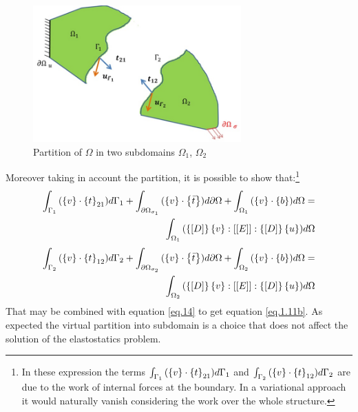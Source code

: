  \begin{figure}[ht]
 \centering
 \includegraphics[width=8cm]{images/Ch1/free_body}
 \caption{Partition of $\Omega$ in two subdomains $\Omega_1$, $\Omega_2$} 
 \label{fig.1.5}
 \end{figure}
 
 Moreover taking in account the partition, it is possible to show that:\footnote{In these expression the terms $\int_{\Gamma_1}{(\left\lbrace{v}\right \rbrace \cdot \left\lbrace{t}\right \rbrace_{21} )d\Gamma_1}$ and $\int_{\Gamma_2}{(\left\lbrace{v}\right \rbrace \cdot \left\lbrace{t}\right \rbrace_{12} )d\Gamma_2}$ are due to the work of internal forces at the boundary. In a variational approach it would naturally vanish considering the work over the whole structure.}
 \begin{equation}
 \begin{aligned}
 \label{eq.15}
 \int_{\Gamma_1}{(\left\lbrace{v}\right \rbrace \cdot \left\lbrace{t}\right \rbrace_{21} )d\Gamma_1}+\int_{\partial \Omega_{\sigma_1}}{(\left\lbrace{v}\right \rbrace \cdot \left\lbrace{\bar{t}}\right \rbrace )d\partial \Omega}+\int_{\Omega_1}{(\left\lbrace{v}\right \rbrace \cdot \left\lbrace{b}\right \rbrace) d\Omega} =\\\int_{\Omega_1}{(\left\lbrace{\ensuremath\left[{D}\right]}\right \rbrace \left\lbrace{v}\right \rbrace :\left[{\left[{E}\right]}\right]:\left\lbrace{\ensuremath\left[{D}\right]}\right \rbrace \left\lbrace{u}\right \rbrace  )d\Omega}
 \end{aligned}
 \end{equation}
 \begin{equation}
 \begin{split}
 \label{eq.16}
 \int_{\Gamma_2}{(\left\lbrace{v}\right \rbrace \cdot \left\lbrace{t}\right \rbrace_{12} )d\Gamma_2}+\int_{\partial \Omega_{\sigma_2}}{(\left\lbrace{v}\right \rbrace \cdot \left\lbrace{\bar{t}}\right \rbrace )d\partial \Omega}+\int_{ \Omega_2}{(\left\lbrace{v}\right \rbrace \cdot \left\lbrace{b}\right \rbrace) d\Omega}=\\\int_{ \Omega_2}{(\left\lbrace{\ensuremath\left[{D}\right]}\right \rbrace \left\lbrace{v}\right \rbrace :\left[{\left[{E}\right]}\right]:\left\lbrace{\ensuremath\left[{D}\right]}\right \rbrace \left\lbrace{u}\right \rbrace  )d\Omega}
 \end{split}
 \end{equation}
 That may be combined with equation \eqref{eq.14} to get equation \eqref{eq.1.11b}.
 As expected the virtual partition into subdomain is a choice that does not affect the solution of the elastostatics problem.   
 \\
